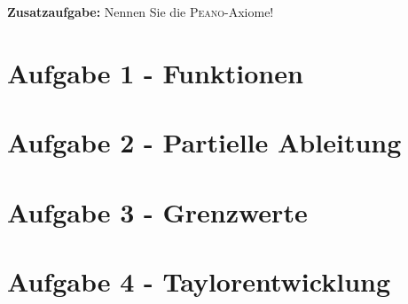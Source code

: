 \newcommand{\examdate}{13.10.2021}
\newcommand{\lecturer}{Andre Wachsmuth}
\newcommand{\modulecode}{3MI-MATHE-10}
\newcommand{\module}{Algebra/Analysis}
\newcommand{\submodule}{Analysis}
\newcommand{\termnumber}{1}
\newcommand{\allottedtime}{40 min}
\newcommand{\permittedtools}{1 handbeschriebenes A4-Blatt}
\newcommand{\scoretable}{
	\begin{tabularx}{\textwidth}{l|Y|Y|Y|Y|Y|Y}
		Aufgabe        & 1 & 2 & 3 & 4  & 5 & Summe \\ [1ex] \hline
		Soll-Punktzahl & 8 & 8 & 8 & 8  & 8 &       \\ [3ex]
		Ist-Punktzahl  &   &   &   &    &    &      ¸\\ [3ex]
	\end{tabularx}
}







\bigskip
\bigskip

\textbf{Zusatzaufgabe:} Nennen Sie die \textsc{Peano}-Axiome!

\newpage

\section* {Aufgabe 1 - Funktionen}



\newpage

\section* {Aufgabe 2 - Partielle Ableitung}



\newpage

\section* {Aufgabe 3 - Grenzwerte}



\newpage

\section* {Aufgabe 4 - Taylorentwicklung}



